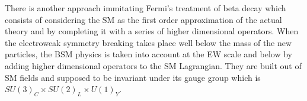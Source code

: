 \documentclass[final,3p]{CSP}
\begin{document}
There is another approach immitating 
Fermi's treatment of beta decay 
which consists of considering the SM as the first order approximation of the actual theory 
and by completing it with a series 
of higher dimensional operators. When the electroweak symmetry breaking takes place well 
below the mass of the new particles, 
the BSM physics is taken into account at the EW scale and below by adding higher dimensional 
operators to the SM Lagrangian. 
They are built out of SM fields and supposed to be invariant under its gauge group which is $SU(3)_C \times SU(2)_L \times U(1)_Y$.

\end{document}
